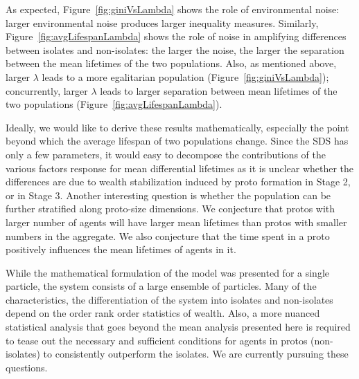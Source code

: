 As expected, Figure~\ref{fig:giniVsLambda} shows the role of environmental noise: larger environmental noise produces larger inequality measures. Similarly, Figure~\ref{fig:avgLifespanLambda} shows the role of noise in amplifying differences between isolates and non-isolates: the larger the noise, the larger the separation between the mean lifetimes of the two populations. Also, as mentioned above, larger $\lambda$ leads to a more egalitarian population (Figure~\ref{fig:giniVsLambda}); concurrently, larger $\lambda$ leads to larger separation between mean lifetimes of the two populations (Figure~\ref{fig:avgLifespanLambda}). 

Ideally, we would like to derive these results mathematically, especially the point beyond which the average lifespan of two populations change. Since the SDS has only a few parameters, it would easy to decompose the contributions of the various factors response for mean differential lifetimes as it is unclear whether the differences are due to wealth stabilization induced by proto formation in Stage 2, or in Stage 3.  Another interesting question is whether the population can be further stratified along proto-size dimensions. We conjecture that protos with larger number of agents will have larger mean lifetimes than protos with smaller numbers in the aggregate. We also conjecture that the time spent in a proto positively influences the mean lifetimes of agents in it.  

While the mathematical formulation of the model was presented for a single particle, the system consists of a large ensemble of particles. Many of the characteristics, the differentiation of the system into isolates and non-isolates depend on the order rank order statistics of wealth. Also, a more nuanced statistical analysis that goes beyond the mean analysis presented here is required to tease out the necessary and sufficient conditions for agents in protos (non-isolates) to consistently outperform the isolates. We are currently pursuing these questions. 

